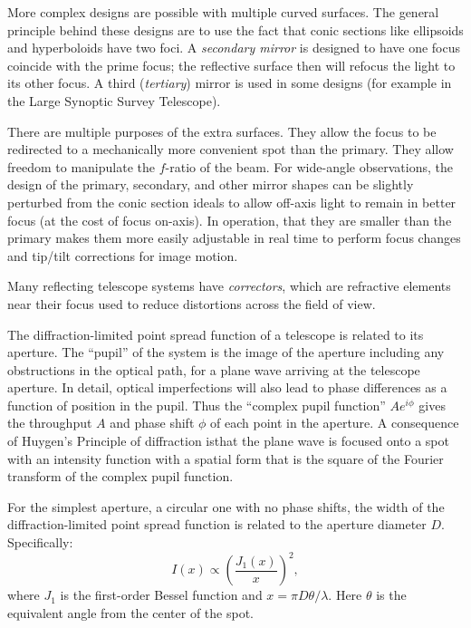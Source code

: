 More complex designs are possible with multiple curved surfaces. The
general principle behind these designs are to use the fact that conic
sections like ellipsoids and hyperboloids have two foci. A {\it
secondary mirror} is designed to have one focus coincide with the
prime focus; the reflective surface then will refocus the light to its
other focus. A third ({\it tertiary}) mirror is used in some designs
(for example in the Large Synoptic Survey Telescope).

There are multiple purposes of the extra surfaces. They allow the
focus to be redirected to a mechanically more convenient spot than the
primary. They allow freedom to manipulate the $f$-ratio of the
beam. For wide-angle observations, the design of the primary,
secondary, and other mirror shapes can be slightly perturbed from the
conic section ideals to allow off-axis light to remain in better focus
(at the cost of focus on-axis). In operation, that they are smaller
than the primary makes them more easily adjustable in real time to
perform focus changes and tip/tilt corrections for image motion.

Many reflecting telescope systems have {\it correctors}, which are
refractive elements near their focus used to reduce distortions across
the field of view.

The diffraction-limited point spread function of a telescope is
related to its aperture. The ``pupil'' of the system is the image of
the aperture including any obstructions in the optical path, for a
plane wave arriving at the telescope aperture. In detail, optical
imperfections will also lead to phase differences as a function of
position in the pupil. Thus the ``complex pupil function'' $A
e^{i\phi}$ gives the throughput $A$ and phase shift $\phi$ of each
point in the aperture. A consequence of Huygen's Principle of
diffraction isthat the plane wave is focused onto a spot with an
intensity function with a spatial form that is the square of the
Fourier transform of the complex pupil function.

For the simplest aperture, a circular one with no phase shifts, the
width of the diffraction-limited point spread function is related to
the aperture diameter $D$. Specifically:
\begin{equation}
\label{eq:psf_tophat}
I(x) \propto \left(\frac{J_1(x)}{x}\right)^2,
\end{equation}
where $J_1$ is the first-order Bessel function and $x=\pi D \theta
/\lambda$. Here $\theta$ is the equivalent angle from the center of
the spot. 

